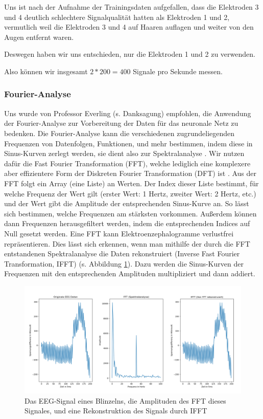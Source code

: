 \documentclass[10pt]{scrartcl}
\begin{document}
	Uns ist nach der Aufnahme der Trainingsdaten aufgefallen, dass die Elektroden 3 und 4 deutlich schlechtere Signalqualität hatten als Elektroden 1 und 2, vermutlich weil die Elektroden 3 und 4 auf Haaren auflagen und weiter von den Augen entfernt waren.

	Deswegen haben wir uns entschieden, nur die Elektroden 1 und 2 zu verwenden.

	Also können wir insgesamt $2 * 200 = 400$ Signale pro Sekunde messen.

	\subsubsection{Fourier-Analyse}
	
	Uns wurde von Professor Everling (s. Danksagung) empfohlen, die Anwendung der Fourier-Analyse zur Vorbereitung der Daten für das neuronale Netz zu bedenken. Die Fourier-Analyse kann die verschiedenen zugrundeliegenden Frequenzen von Datenfolgen, Funktionen, und mehr bestimmen, indem diese in Sinus-Kurven zerlegt werden, sie dient also zur Spektralanalyse \cite{3b1b:fft}. Wir nutzen dafür die Fast Fourier Transformation (FFT), welche lediglich eine komplexere aber effizientere Form der Diskreten Fourier Transformation (DFT) ist \cite{FFT-DFT}. 
	Aus der FFT folgt ein Array (eine Liste) an Werten. Der Index dieser Liste bestimmt, für welche Frequenz der Wert gilt (erster Wert: 1 Hertz, zweiter Wert: 2 Hertz, etc.) und der Wert gibt die Amplitude der entsprechenden Sinus-Kurve an. So lässt sich bestimmen, welche Frequenzen am stärksten vorkommen. Außerdem können dann Frequenzen herausgefiltert werden, indem die entsprechenden Indices auf Null gesetzt werden. 
	Eine FFT kann Elektroenzephalogramme verlustfrei repräsentieren. Dies lässt sich erkennen, wenn man mithilfe der durch die FFT entstandenen Spektralanalyse die Daten rekonstruiert (Inverse Fast Fourier Transformation, IFFT) (s. Abbildung \ref{EEG-IFFT}). Dazu werden die Sinus-Kurven der Frequenzen mit den entsprechenden Amplituden multipliziert und dann addiert.

	\begin{figure}[h!]
		\includegraphics[width=\textwidth]{pictures/blink_fft_ifft.png}
		\caption{Das EEG-Signal eines Blinzelns, die Amplituden des FFT dieses Signales, und eine Rekonstruktion des Signals durch IFFT}
		\label{EEG-IFFT}
	\end{figure}
\end{document}
